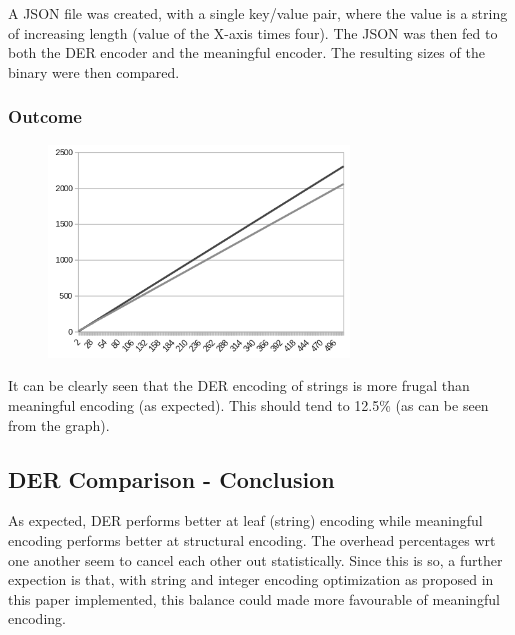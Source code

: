 A JSON file was created, with a single key/value pair, where the value
is a string of increasing length (value of the X-axis times four).
The JSON was then fed to both the DER
encoder and the meaningful encoder. The resulting sizes of the binary were
then compared.

\subsubsection{Outcome}

\begin{figure}[H]
\centering
\includegraphics[width=80mm]{stringcomparison}
\end{figure}

It can be clearly seen that the DER encoding of strings is more
frugal than meaningful encoding (as expected). This should tend to
12.5\% (as can be seen from the graph).

\subsection{DER Comparison - Conclusion}

As expected, DER performs better at leaf (string) encoding while
meaningful encoding performs better at structural encoding.
The overhead percentages wrt one another seem to cancel each other
out statistically. Since this is so, a further expection is that, with string
and integer encoding optimization as proposed in this paper implemented,
this balance could made more favourable of meaningful encoding.


